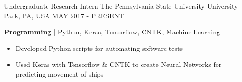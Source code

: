 

\begin{cventries}
	
	\cventry
	{Undergraduate Research Intern} %
	{The Pennsylvania State University} %
	{University Park, PA, USA} %
	{MAY 2017 - PRESENT} %
	{
		\begin{cvitems} %
			\item {\textbf{Programming} | {\color{awesome}Python, Keras, Tensorflow, CNTK, Machine Learning}
				\begin{itemize}[noitemsep,wide=0pt, leftmargin=\dimexpr{} + 2\relax]
					\item[\textbullet]{Developed Python scripts for automating software tests}
					\item[\textbullet]{Used Keras with Tensorflow \& CNTK to create Neural Networks for predicting movement of ships}
				\end{itemize}}
		\end{cvitems}
	}
	

\end{cventries}
